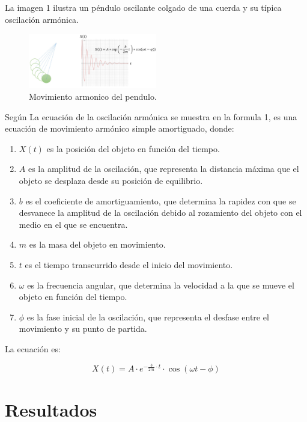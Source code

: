 \documentclass[conference]{IEEEtran}
\begin{document}
La imagen 1 ilustra un péndulo oscilante colgado de una cuerda y su típica
oscilación armónica.
\begin{figure}[h!]
    \centering
    \includegraphics[width=0.5\textwidth, keepaspectratio]{Figures/image1.png}
    \caption{Movimiento armonico del pendulo. \cite{aziz2022}}
    \label{fig:mi_etiqueta}
\end{figure}

Según \cite{aziz2022} La ecuación de la oscilación armónica se muestra en la
formula 1, es una ecuación de movimiento armónico simple amortiguado, donde:

\begin{enumerate}
    \item $X(t)$ es la posición del objeto en función del tiempo.
    \item $A$ es la amplitud de la oscilación, que representa la distancia
          máxima que el objeto se desplaza desde su posición de equilibrio.
    \item $b$ es el coeficiente de amortiguamiento, que determina la rapidez
          con que se desvanece la amplitud de la oscilación debido al
          rozamiento del
          objeto con el medio en el que se encuentra.
    \item $m$ es la masa del objeto en movimiento.
    \item $t$ es el tiempo transcurrido desde el inicio del movimiento.
    \item $\omega$ es la frecuencia angular, que determina la velocidad a la
          que se mueve el objeto en función del tiempo.
    \item $\phi$ es la fase inicial de la oscilación, que representa el desfase
          entre el movimiento y su punto de partida.
\end{enumerate}

La ecuación es:

\begin{equation}
    X(t) = A \cdot e^{-\frac{b}{2m} \cdot t} \cdot \cos(\omega t - \phi)
\end{equation}

\section{Resultados}
\label{sec:Res}
\end{document}
